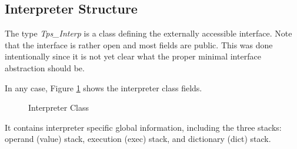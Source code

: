 \subsection{Interpreter Structure}
\label{interp}
The type {\em Tps\_Interp} is a \CC{} class
defining the externally accessible interface.
Note that the interface is rather open and most
fields are public.  This was done intentionally
since it is not yet clear what the proper minimal interface
abstraction should be.

In any case,
Figure \ref{interpstruct} shows the interpreter class fields.
\begin{figure}[t]\centering

\caption{Interpreter Class}
\label{interpstruct}
\horizontalline
\end{figure}
It contains
interpreter specific global information, including the three
stacks: operand (value) stack, execution (exec) stack,
and dictionary (dict) stack.

